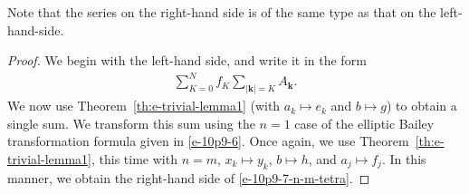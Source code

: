 \documentclass[pdftex]{sigma}
\numberwithin{equation}{section}
\newcommand\sumk{{\left| \boldsymbol{k} \right|}}
\renewcommand{\k}{{ \boldsymbol{k}}}
\begin{document}
Note that the series on the right-hand side is of the same type as that on the
left-hand-side.
\begin{proof}
We begin with the left-hand side, and write it in the form
\begin{gather*}\sum_{K=0}^N f_K \sum_{\sumk = K} A_\k.\end{gather*}
We now use Theorem~\ref{th:e-trivial-lemma1} (with $a_k\mapsto e_k$ and $b\mapsto g$) to obtain a single sum. We transform this sum using the $n=1$ case of the elliptic Bailey transformation formula given in \eqref{e-10p9-6}. Once again, we use Theorem~\ref{th:e-trivial-lemma1}, this time with $n=m$, $x_k\mapsto y_k$, $b\mapsto h$, and $a_j\mapsto f_j$. In this manner, we obtain the right-hand side of \eqref{e-10p9-7-n-m-tetra}.
\end{proof}
\end{document}
